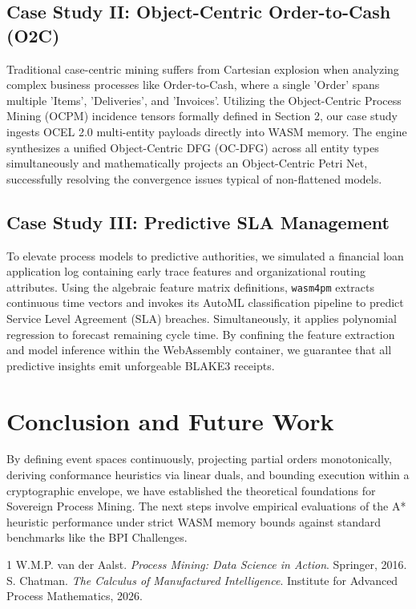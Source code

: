 \documentclass[11pt,a4paper,twocolumn]{article}
\begin{document}
\subsection{Case Study II: Object-Centric Order-to-Cash (O2C)}
Traditional case-centric mining suffers from Cartesian explosion when analyzing complex business processes like Order-to-Cash, where a single 'Order' spans multiple 'Items', 'Deliveries', and 'Invoices'. Utilizing the Object-Centric Process Mining (OCPM) incidence tensors formally defined in Section 2, our case study ingests OCEL 2.0 multi-entity payloads directly into WASM memory. The engine synthesizes a unified Object-Centric DFG (OC-DFG) across all entity types simultaneously and mathematically projects an Object-Centric Petri Net, successfully resolving the convergence issues typical of non-flattened models.

\subsection{Case Study III: Predictive SLA Management}
To elevate process models to predictive authorities, we simulated a financial loan application log containing early trace features and organizational routing attributes. Using the algebraic feature matrix definitions, \texttt{wasm4pm} extracts continuous time vectors and invokes its AutoML classification pipeline to predict Service Level Agreement (SLA) breaches. Simultaneously, it applies polynomial regression to forecast remaining cycle time. By confining the feature extraction and model inference within the WebAssembly container, we guarantee that all predictive insights emit unforgeable BLAKE3 receipts.

\section{Conclusion and Future Work}
By defining event spaces continuously, projecting partial orders monotonically, deriving conformance heuristics via linear duals, and bounding execution within a cryptographic envelope, we have established the theoretical foundations for Sovereign Process Mining. The next steps involve empirical evaluations of the A* heuristic performance under strict WASM memory bounds against standard benchmarks like the BPI Challenges.


\begin{thebibliography}{1}
W.M.P. van der Aalst. \textit{Process Mining: Data Science in Action}. Springer, 2016.
S. Chatman. \textit{The Calculus of Manufactured Intelligence}. Institute for Advanced Process Mathematics, 2026.
\end{thebibliography}
\end{document}
